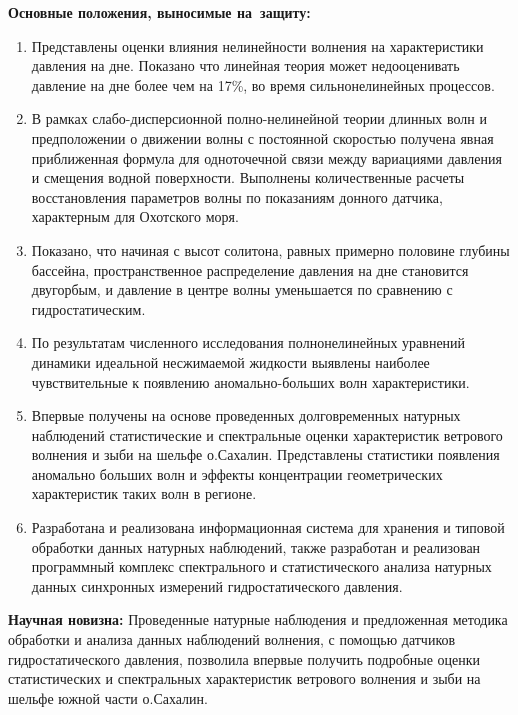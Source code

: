 \textbf{Основные положения, выносимые на~защиту:}
\begin{enumerate}
  \item Представлены оценки влияния нелинейности волнения на характеристики давления на дне. Показано что линейная теория может недооценивать давление на дне более чем на 17\%, во время сильнонелинейных процессов.

  \item В рамках слабо-дисперсионной полно-нелинейной теории длинных волн и предположении о движении волны с постоянной скоростью получена явная приближенная формула для одноточечной связи между вариациями давления и смещения водной поверхности. Выполнены количественные расчеты восстановления параметров волны по показаниям донного датчика, характерным для Охотского моря.

  \item Показано, что начиная с высот солитона, равных примерно половине глубины бассейна, пространственное распределение давления на дне становится двугорбым, и давление в центре волны уменьшается по сравнению с гидростатическим.

  \item По результатам численного исследования полнонелинейных уравнений динамики идеальной несжимаемой жидкости выявлены наиболее чувствительные к появлению аномально-больших волн характеристики.

  \item Впервые получены на основе проведенных долговременных натурных наблюдений статистические и спектральные оценки характеристик ветрового волнения и зыби на шельфе о.Сахалин. Представлены статистики появления аномально больших волн и эффекты концентрации геометрических характеристик таких волн в регионе.

  \item Разработана и реализована информационная система для хранения и типовой обработки данных натурных наблюдений, также разработан и реализован программный комплекс спектрального и статистического анализа натурных данных синхронных измерений гидростатического давления.
\end{enumerate}


\textbf{Научная новизна:}
Проведенные натурные наблюдения и предложенная методика обработки и анализа данных наблюдений волнения, с помощью датчиков гидростатического давления, позволила впервые получить подробные оценки статистических и спектральных характеристик ветрового волнения и зыби на шельфе южной части о.Сахалин.

